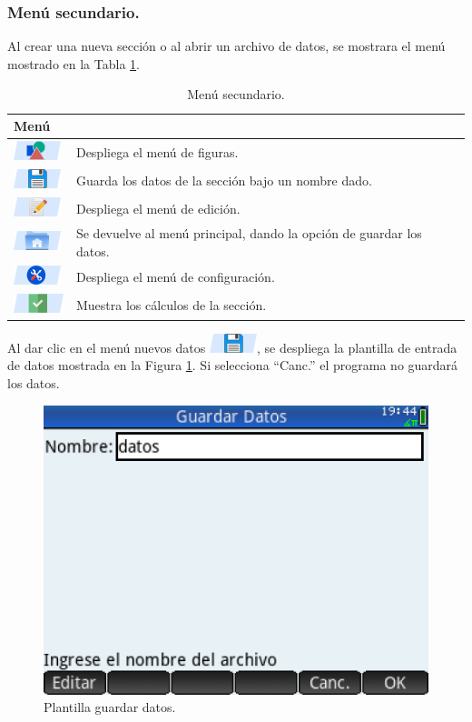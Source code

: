 \documentclass[spanish,xcolor=pdftex,dvipsnames,table,mathserif]{scrartcl}
\begin{document}
\subsubsection{Menú secundario.}
Al crear una nueva sección o al abrir un archivo de datos, se mostrara el menú mostrado en la Tabla \ref{tab:menuSecundario}. 
\begin{table}[H]
	\caption{Menú secundario.}
	\label{tab:menuSecundario}
	\begin{tabular}{>{\centering}m{2cm}>{\raggedright}m{14cm}}
		\toprule 
		\textbf{Menú} & \multicolumn{1}{c}{\textbf{Descripción}} \tabularnewline
		\midrule 
		\includegraphics{imagenes/men_figuras}
		& Despliega el menú de figuras.\tabularnewline	
		\cmidrule(lr){1-2}
		\includegraphics{imagenes/men_guardar}& Guarda los datos de la sección bajo un nombre dado.\tabularnewline
		\cmidrule(lr){1-2}
		\includegraphics{imagenes/men_editar}& Despliega el menú de edición.\tabularnewline
		\cmidrule(lr){1-2}
		\includegraphics{imagenes/men_home}& Se devuelve al menú principal, dando la opción de guardar los datos.\tabularnewline
		\cmidrule(lr){1-2}
		\includegraphics{imagenes/men_cfg} & Despliega el menú de configuración.\tabularnewline
		\cmidrule(lr){1-2}
		\includegraphics{imagenes/men_aceptar}& Muestra los cálculos de la sección.\tabularnewline
		\bottomrule
	\end{tabular}
\end{table}
Al dar clic en el menú nuevos datos \includegraphics{imagenes/men_guardar}, se despliega la plantilla de entrada de datos mostrada en la Figura \ref{fig:guardar}. Si selecciona ``Canc.'' el programa no guardará los datos.
\begin{figure}[H]
	\centering
	\caption[Plantilla guardar datos.]{Plantilla guardar datos.}
	\label{fig:guardar}
	\includegraphics[width=0.45\linewidth]{imagenes/guardar}
\end{figure}
\end{document}
